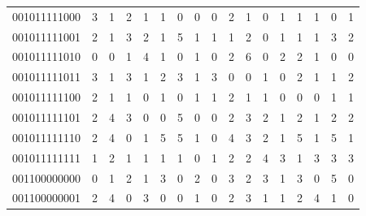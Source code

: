 \documentclass[10pt,a4paper]{article}
\begin{document}
\begin{longtable}{ |c|c|c|c|c|c|c|c|c|c|c|c|c|c|c|c|c| }
    001011111000              & 3                            & 1                                & 2                            & 1                              & 1   & 0   & 0   & 0   & 2   & 1   & 0   & 1   & 1   & 1   & 0   & 1   \\
    001011111001              & 2                            & 1                                & 3                            & 2                              & 1   & 5   & 1   & 1   & 1   & 2   & 0   & 1   & 1   & 1   & 3   & 2   \\
    001011111010              & 0                            & 0                                & 1                            & 4                              & 1   & 0   & 1   & 0   & 2   & 6   & 0   & 2   & 2   & 1   & 0   & 0   \\
    001011111011              & 3                            & 1                                & 3                            & 1                              & 2   & 3   & 1   & 3   & 0   & 0   & 1   & 0   & 2   & 1   & 1   & 2   \\
    001011111100              & 2                            & 1                                & 1                            & 0                              & 1   & 0   & 1   & 1   & 2   & 1   & 1   & 0   & 0   & 0   & 1   & 1   \\
    001011111101              & 2                            & 4                                & 3                            & 0                              & 0   & 5   & 0   & 0   & 2   & 3   & 2   & 1   & 2   & 1   & 2   & 2   \\
    001011111110              & 2                            & 4                                & 0                            & 1                              & 5   & 5   & 1   & 0   & 4   & 3   & 2   & 1   & 5   & 1   & 5   & 1   \\
    001011111111              & 1                            & 2                                & 1                            & 1                              & 1   & 1   & 0   & 1   & 2   & 2   & 4   & 3   & 1   & 3   & 3   & 3   \\
    001100000000              & 0                            & 1                                & 2                            & 1                              & 3   & 0   & 2   & 0   & 3   & 2   & 3   & 1   & 3   & 0   & 5   & 0   \\
    001100000001              & 2                            & 4                                & 0                            & 3                              & 0   & 0   & 1   & 0   & 2   & 3   & 1   & 1   & 2   & 4   & 1   & 0   \\

\end{longtable}
\end{document}
